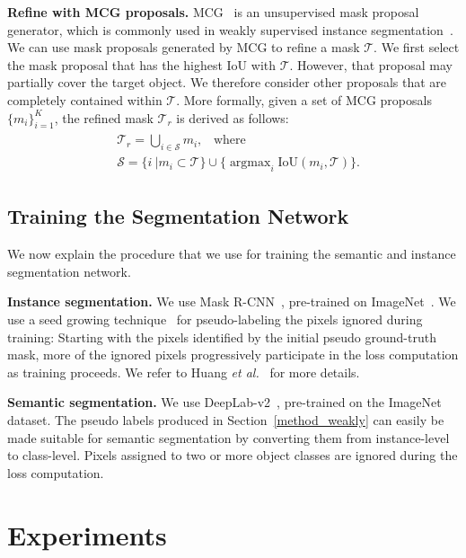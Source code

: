 \documentclass[final]{cvpr}
\newcommand{\argmax}{\mathop{\mathrm{argmax}}}
\begin{document}
\textbf{Refine with MCG proposals.} 
MCG~\cite{pont2016multiscale} is an unsupervised mask proposal generator, which is commonly used in weakly supervised instance segmentation~\cite{zhou2018weakly, zhu2019learning, arun2020weakly, liu2020leveraging, khoreva2017simple}.
We can use mask proposals generated by MCG to refine a mask $\mathcal{T}$.
We first select the mask proposal that has the highest IoU with $\mathcal{T}$.
However, that proposal may partially cover the target object. We therefore consider other proposals that are completely contained within $\mathcal{T}$.
More formally, given a set of MCG proposals $\{m_i\}_{i=1}^K$, the refined mask $\mathcal{T}_{r}$ is derived as follows:
\begin{align}\label{eq_mcg}
\begin{split}
&\mathcal{T}_{r}= \bigcup\limits_{i\in \mathcal{S}} m_{i} \text{,~~~where} \\
&\mathcal{S} = \{i~|m_i \subset \mathcal{T}\} \cup \{\argmax_i \text{IoU}(m_i, \mathcal{T})\}.
\end{split}
\end{align}

\subsection{Training the Segmentation Network}\label{train_seg_net}
We now explain the procedure that we use for training the semantic and instance segmentation network. 


\textbf{Instance segmentation.}
We use Mask R-CNN~\cite{he2017mask}, pre-trained on ImageNet~\cite{deng2009imagenet}.
We use a seed growing technique~\cite{huang2018weakly, ahn2018learning, lee2019ficklenet, lee2019frame} for pseudo-labeling the pixels ignored during training: 
Starting with the pixels identified by the initial pseudo ground-truth mask, more of the ignored pixels progressively participate in the loss computation as training proceeds. We refer to Huang \textit{et al.}~\cite{huang2018weakly} for more details.

\textbf{Semantic segmentation.}
We use DeepLab-v2~\cite{chen2017deeplab}, pre-trained on the ImageNet~\cite{deng2009imagenet} dataset. The pseudo labels produced in Section~\ref{method_weakly} can easily be made suitable for semantic segmentation by converting them from instance-level to class-level.
Pixels assigned to two or more object classes are ignored during the loss computation.



\section{Experiments}
\end{document}
